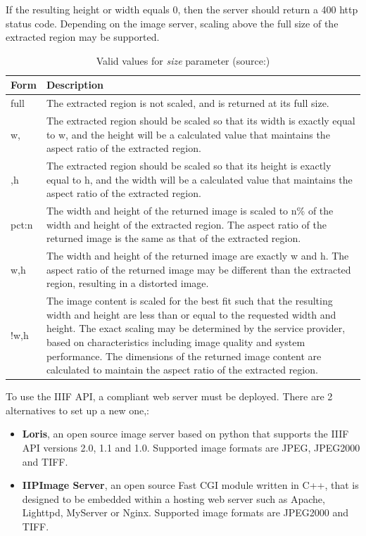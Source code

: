 If the resulting height or width equals 0, then the server should return a 400 http status code. Depending on the image server, scaling above the full size of the extracted region may be supported\cite{web:iiif}.

\begin{table}[H]
	\begin{center}
		\begin{tabular}{| p{2cm} | p{9cm} |}
			\hline
			\textbf{Form} & \textbf{Description}\\ \hline
			full & The extracted region is not scaled, and is returned at its full size.\\ \hline
			w, & The extracted region should be scaled so that its width is exactly equal to w, and the height will be a calculated value that maintains the aspect ratio of the extracted region.\\ \hline
			,h & The extracted region should be scaled so that its height is exactly equal to h, and the width will be a calculated value that maintains the aspect ratio of the extracted region.\\ \hline
			pct:n & The width and height of the returned image is scaled to n\% of the width and height of the extracted region. The aspect ratio of the returned image is the same as that of the extracted region.\\ \hline
			w,h & The width and height of the returned image are exactly w and h. The aspect ratio of the returned image may be different than the extracted region, resulting in a distorted image.\\ \hline
			!w,h & The image content is scaled for the best fit such that the resulting width and height are less than or equal to the requested width and height. The exact scaling may be determined by the service provider, based on characteristics including image quality and system performance. The dimensions of the returned image content are calculated to maintain the aspect ratio of the extracted region.\\ \hline
		\end{tabular}
		\caption{Valid values for \emph{size} parameter (source:\cite{web:iiif})}
	\end{center}
\end{table}

To use the IIIF API, a compliant web server must be deployed. There are 2 alternatives to set up a new one\cite{web:openseadragon},\cite{web:iiif2}:
\begin{itemize}
	\item \textbf{Loris}, an open source image server based on python that supports the IIIF API versions 2.0, 1.1 and 1.0. Supported image formats are JPEG, JPEG2000 and TIFF.
	\item \textbf{IIPImage Server}, an open source Fast CGI module written in C++, that is designed to be embedded within a hosting web server such as Apache, Lighttpd, MyServer or Nginx. Supported image formats are JPEG2000 and TIFF.
\end{itemize}

